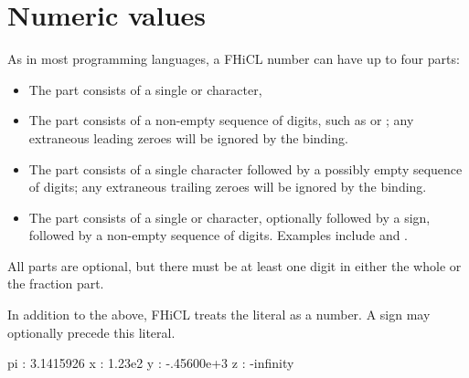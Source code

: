 \documentclass[draftmode,draftwater]{memarticle}
\newcommand{\fhicl}%
 {FHiCL\xspace}
\begin{document}
\section{Numeric values}
%

As in most programming languages, a \fhicl number can have up to four
parts:
\begin{itemize}
\item The  part consists of a single \fclcode{+} or
  \fclcode{-} character,
\item The  part consists of a non-empty sequence of
  digits, such as  or ; any extraneous leading
  zeroes will be ignored by the binding.
\item The  part consists of a single 
  character followed by a possibly empty sequence of digits; any
  extraneous trailing zeroes will be ignored by the binding.
\item The  part consists of a single  or
   character, optionally followed by a sign, followed by a
  non-empty sequence of digits.  Examples include  and
  .
\end{itemize}
All parts are optional, but there must be at least one digit in either
the whole or the fraction part.

In addition to the above, \fhicl treats the literal 
as a number.  A sign may optionally precede this literal.
%
%
\Needspace{0.67in}
\begin{fcllisting}[texcl,escapechar=`]
pi : 3.1415926
x  : 1.23e2
y  : -.45600e+3
z  : -infinity
\end{fcllisting}
\end{document}
